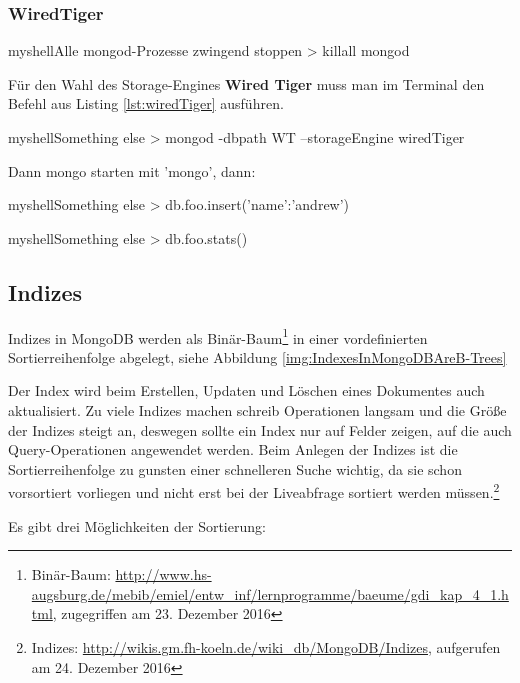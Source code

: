 \subsubsection{WiredTiger}

\begin{listingsboxShell}[label={lst:X}]{myshell}{Alle mongod-Prozesse zwingend stoppen}
> killall mongod
\end{listingsboxShell}

Für den Wahl des Storage-Engines \textbf{Wired Tiger} muss man im Terminal den Befehl aus Listing \ref{lst:wiredTiger} ausführen.

\begin{listingsboxShell}[label={lst:wiredTiger}]{myshell}{Something else}
> mongod -dbpath WT --storageEngine wiredTiger
\end{listingsboxShell}

Dann mongo starten mit 'mongo', dann:

\begin{listingsboxShell}[label={lst:X}]{myshell}{Something else}
> db.foo.insert({'name':'andrew'})
\end{listingsboxShell}

\begin{listingsboxShell}[label={lst:X}]{myshell}{Something else}
> db.foo.stats()
\end{listingsboxShell}

\subsection{Indizes}
Indizes in MongoDB werden als Binär-Baum\footnote{Binär-Baum: \url{http://www.hs-augsburg.de/mebib/emiel/entw_inf/lernprogramme/baeume/gdi_kap_4_1.html}, zugegriffen am 23. Dezember 2016} in einer vordefinierten Sortierreihenfolge abgelegt, siehe Abbildung \ref{img:IndexesInMongoDBAreB-Trees}

Der Index wird beim Erstellen, Updaten und Löschen eines Dokumentes auch aktualisiert. Zu viele Indizes machen schreib Operationen langsam und die Größe der Indizes steigt an, deswegen sollte ein Index nur auf Felder zeigen, auf die auch Query-Operationen angewendet werden. Beim Anlegen der Indizes ist die Sortierreihenfolge zu gunsten einer schnelleren Suche wichtig, da sie schon vorsortiert vorliegen und nicht erst bei der Liveabfrage sortiert werden müssen.\footnote{Indizes: \url{http://wikis.gm.fh-koeln.de/wiki_db/MongoDB/Indizes}, aufgerufen am 24. Dezember 2016}

Es gibt drei Möglichkeiten der Sortierung:

